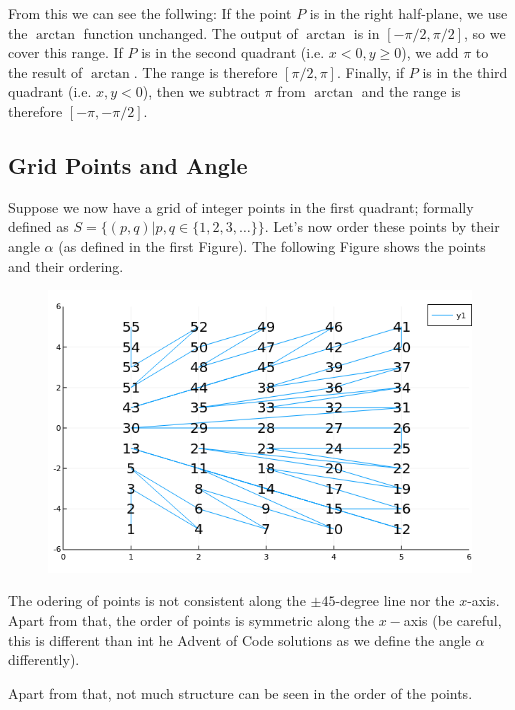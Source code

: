 From this we can see the follwing: If the point $P$ is in the right half-plane, we use the $\arctan$ function unchanged. The output of $\arctan$ is in $[-\pi/2, \pi/2]$, so we cover this range. If $P$ is in the second quadrant (i.e. $x < 0, y \geq 0$), we add $\pi$ to the result of $\arctan$. The range is therefore $[\pi/2, \pi]$. Finally, if $P$ is in the third quadrant (i.e. $x, y < 0$), then we subtract $\pi$ from $\arctan$ and the range is therefore $[-\pi, -\pi/2]$.


\subsection{Grid Points and Angle}

Suppose we now have a grid of integer points in the first quadrant; formally defined as $S = \{ (p,q) | p,q \in \{1,2,3,\ldots\} \}$. Let's now order these points by their angle $\alpha$ (as defined in the first Figure). The following Figure shows the points and their ordering.


\begin{figure}[H]
\centering
\includegraphics[scale=0.5]{images/AoC_2019_10_03.png}
\end{figure}

The odering of points is not consistent along the $\pm 45$-degree line nor the $x$-axis. Apart from that, the order of points is symmetric along the $x-$axis (be careful, this is different than int he Advent of Code solutions as we define the angle $\alpha$ differently). 

Apart from that, not much structure can be seen in the order of the points.




